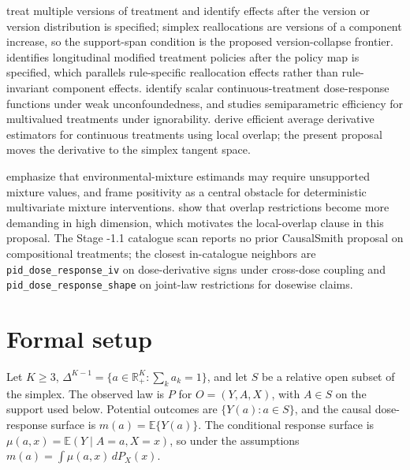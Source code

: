 \documentclass[11pt]{article}
\newcommand{\E}{\mathbb{E}}
\newcommand{\R}{\mathbb{R}}
\theoremstyle{definition}
\theoremstyle{plain}
\theoremstyle{remark}
\begin{document}
\citet{VanderWeeleHernan2013} treat multiple versions of treatment and identify effects after the version or version distribution is specified; simplex reallocations are versions of a component increase, so the support-span condition is the proposed version-collapse frontier. \citet{Diaz2023LMTP} identifies longitudinal modified treatment policies after the policy map is specified, which parallels rule-specific reallocation effects rather than rule-invariant component effects. \citet{HiranoImbens2004} identify scalar continuous-treatment dose-response functions under weak unconfoundedness, and \citet{Cattaneo2010} studies semiparametric efficiency for multivalued treatments under ignorability. \citet{HinesDiazOrdazVansteelandt2026} derive efficient average derivative estimators for continuous treatments using local overlap; the present proposal moves the derivative to the simplex tangent space.

\citet{AntonelliZigler2024} emphasize that environmental-mixture estimands may require unsupported mixture values, and \citet{HuangDongLinAntonelli2026} frame positivity as a central obstacle for deterministic multivariate mixture interventions. \citet{DAmourDingFellerLeiSekhon2021} show that overlap restrictions become more demanding in high dimension, which motivates the local-overlap clause in this proposal. The Stage -1.1 catalogue scan reports no prior CausalSmith proposal on compositional treatments; the closest in-catalogue neighbors are \texttt{pid\_dose\_response\_iv} on dose-derivative signs under cross-dose coupling and \texttt{pid\_dose\_response\_shape} on joint-law restrictions for dosewise claims.

\section{Formal setup}
Let \(K\geq 3\), \(\Delta^{K-1}=\{a\in\R_+^K:\sum_k a_k=1\}\), and let \(S\) be a relative open subset of the simplex. The observed law is \(P\) for \(O=(Y,A,X)\), with \(A\in S\) on the support used below. Potential outcomes are \(\{Y(a):a\in S\}\), and the causal dose-response surface is \(m(a)=\E\{Y(a)\}\). The conditional response surface is \(\mu(a,x)=\E(Y\mid A=a,X=x)\), so under the assumptions \(m(a)=\int \mu(a,x)\,dP_X(x)\).
\end{document}
